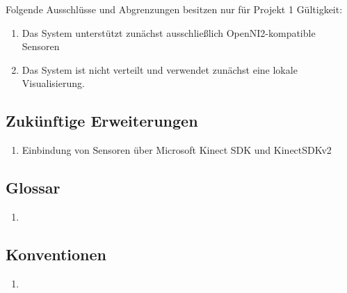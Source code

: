 Folgende Ausschlüsse und Abgrenzungen besitzen nur für Projekt 1 Gültigkeit:

\begin{enumerate}
	\item Das System unterstützt zunächst ausschließlich OpenNI2-kompatible Sensoren
	\item Das System ist nicht verteilt und verwendet zunächst eine lokale Visualisierung.
\end{enumerate}

\subsection{Zukünftige Erweiterungen}

\begin{enumerate}
	\item Einbindung von Sensoren über Microsoft Kinect SDK und KinectSDKv2
\end{enumerate}

\subsection{Glossar}

\begin{enumerate}
	\item
\end{enumerate}

\subsection{Konventionen}

\begin{enumerate}
	\item
\end{enumerate}